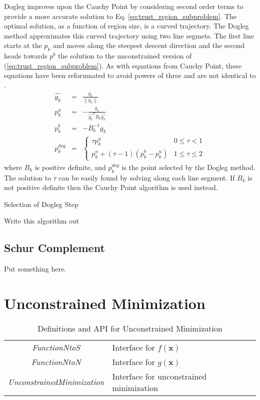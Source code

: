 \documentclass[peerreview,onecolumn]{IEEEtran}
\newcommand{\norm}[1]{\left\lVert#1\right\rVert}
\begin{document}
Dogleg improves upon the Cauchy Point by considering second order terms to provide a more accurate solution to Eq. \ref{eq:trust_region_subproblem}. The optimal solution, as a function of region size, is a curved trajectory. The Dogleg method approximates this curved trajectory using two line segmets. The first line starts at the $p_k$ and moves along the steepest descent direction and the second heads towards $p^b$ the solution to the unconstrained version of (\ref{eq:trust_region_subproblem}). As with equations from Cauchy Point, these equations have been reforumated to avoid powers of three and are not identical to \cite{numopt2006,IMM2004}.
\begin{eqnarray}
\hat{g_k} &=& \frac{g_k}{\norm{g_k}} \\
p^u_k &=& -\frac{g_k}{\hat{g_k}^T B_k \hat{g_k}} \\
p^b_k &=& -B^{-1}_k g_k \\
p^{dog}_k &=&
\begin{cases}
	\tau p^u_k & 0 \le \tau < 1 \\
	p^u_k + (\tau -1)(p^b_k-p^u_k) & 1 \le \tau \le 2
\end{cases}
\end{eqnarray}
where $B_k$ is positive definite, and $p^{dog}_k$ is the point selected by the Dogleg method. The solution to $\tau$ can be easily found by solving along each line segment. If $B_k$ is not positive definite then the Cauchy Point algorithm is used instead.

\begin{algorithm}{}
\caption{\label{alg:dogleg_step}Selection of Dogleg Step}
\begin{algorithmic}[1]
	\State Write this algorithm out
\end{algorithmic}
\end{algorithm}

\subsection{Schur Complement}

Put something here.

\section{Unconstrained Minimization}

\begin{table}[h]
\centering
\caption{\label{definitions:UM}Definitions and API for Unconstrained Minimization}
\begin{tabular}{cl}
\textit{FunctionNtoS} & Interface for $f(\bm{x})$ \\
\textit{FunctionNtoN} & Interface for $g(\bm{x})$ \\
\textit{UnconstrainedMinimization} & Interface for unconstrained minimization
\end{tabular}
\end{table}
\end{document}
